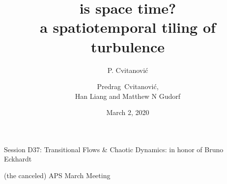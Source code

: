 

                        \newif\ifboyscout\boyscouttrue          %
                        \newif\ifsubmission\submissionfalse     %
                        \newif\ifblog\blogfalse %


\usepackage[font=scriptsize, labelfont=bf]{caption}
\usepackage[
    backend=biber,  %
    sorting=nyt,
    style=numeric, %
    natbib=true,
    style=phys, %
    biblabel= brackets, %
    articletitle=false, %
    pageranges = true , %
    sortlocale=en_US,
    firstinits=true,
    url=false, %
    doi=false, %
    eprint=false
]{biblatex}



\renewcommand{\Ssym}[1]{{\ensuremath{m_{#1}}}}    %



\title{
{\huge is space time?}
    \\
{a spatiotemporal tiling of turbulence}
}
\author{P. Cvitanovi\'c}
\author[Cvitanovi\'c]
{
  \textcolor{green!50!black}{
  {Predrag~Cvitanovi\'c, \\
  Han Liang
  and
  Matthew N Gudorf
  }	%
  }
}
\institute
{
 {Session D37}:
    Transitional Flows \& Chaotic Dynamics:
    in honor of Bruno Eckhardt
\medskip

                (the canceled) APS March Meeting
 }
\date{March 2, 2020}

\begin{frame}
  \titlepage
\end{frame}

